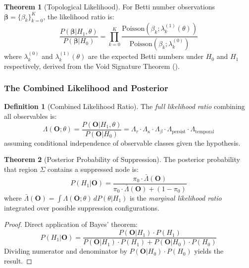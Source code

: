 \documentclass[12pt,a4paper]{article}
\theoremstyle{definition}
\newtheorem{definition}{Definition}[section]
\newtheorem{theorem}{Theorem}[section]
\theoremstyle{remark}
\begin{document}
\begin{theorem}[Topological Likelihood]
\label{thm:topo-likelihood}
For Betti number observations $\boldsymbol{\beta} = \{\beta_k\}_{k=0}^K$, the likelihood ratio is:
\begin{equation}
    \boxed{
    \frac{P(\boldsymbol{\beta} | H_1, \theta)}{P(\boldsymbol{\beta} | H_0)} = \prod_{k=0}^{K} \frac{\text{Poisson}(\beta_k; \lambda_k^{(1)}(\theta))}{\text{Poisson}(\beta_k; \lambda_k^{(0)})}
    }
\end{equation}
where $\lambda_k^{(0)}$ and $\lambda_k^{(1)}(\theta)$ are the expected Betti numbers under $H_0$ and $H_1$ respectively, derived from the Void Signature Theorem ().
\end{theorem}

\subsubsection{The Combined Likelihood and Posterior}

\begin{definition}[Combined Likelihood Ratio]
The \emph{full likelihood ratio} combining all observables is:
\begin{equation}
    \Lambda(\mathbf{O}; \theta) = \frac{P(\mathbf{O} | H_1, \theta)}{P(\mathbf{O} | H_0)} = \Lambda_\tau \cdot \Lambda_\kappa \cdot \Lambda_\beta \cdot \Lambda_{\text{persist}} \cdot \Lambda_{\text{temporal}}
\end{equation}
assuming conditional independence of observable classes given the hypothesis.
\end{definition}

\begin{theorem}[Posterior Probability of Suppression]
\label{thm:posterior}
The posterior probability that region $\Sigma$ contains a suppressed node is:
\begin{equation}
    \boxed{
    P(H_1 | \mathbf{O}) = \frac{\pi_0 \cdot \bar{\Lambda}(\mathbf{O})}{\pi_0 \cdot \bar{\Lambda}(\mathbf{O}) + (1 - \pi_0)}
    }
\end{equation}
where $\bar{\Lambda}(\mathbf{O}) = \int \Lambda(\mathbf{O}; \theta) \, dP(\theta | H_1)$ is the \emph{marginal likelihood ratio} integrated over possible suppression configurations.
\end{theorem}

\begin{proof}
Direct application of Bayes' theorem:
\begin{equation}
    P(H_1 | \mathbf{O}) = \frac{P(\mathbf{O} | H_1) \cdot P(H_1)}{P(\mathbf{O} | H_1) \cdot P(H_1) + P(\mathbf{O} | H_0) \cdot P(H_0)}
\end{equation}
Dividing numerator and denominator by $P(\mathbf{O} | H_0) \cdot P(H_0)$ yields the result.
\end{proof}
\end{document}
